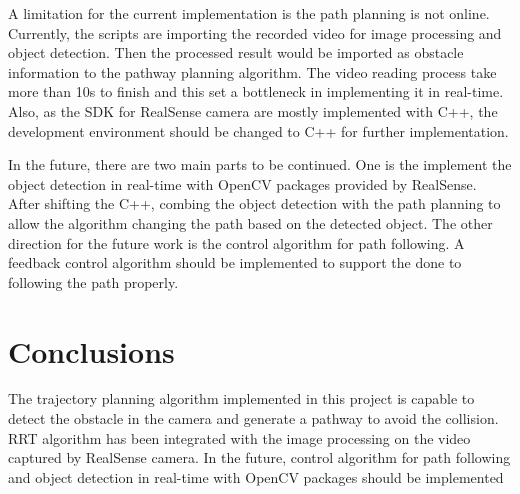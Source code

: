 \documentclass[
  oneside]{ubcthesis}
\begin{document}
A limitation for the current implementation is the path planning is not online. Currently, the scripts are importing the recorded video for image processing and object detection. Then the processed result would be imported as obstacle information to the pathway planning algorithm. The video reading process take more than 10s to finish and this set a bottleneck in implementing it in real-time. Also, as the SDK for RealSense camera are mostly implemented with C++, the development environment should be changed to C++ for further implementation.

In the future, there are two main parts to be continued. One is the implement the object detection in real-time with OpenCV packages provided by RealSense. After shifting the C++, combing the object detection with the path planning to allow the algorithm changing the path based on the detected object. The other direction for the future work is the control algorithm for path following. A feedback control algorithm should be implemented to support the done to following the path properly.

\hypertarget{conclusions}{%
\chapter{Conclusions}\label{conclusions}}

The trajectory planning algorithm implemented in this project is capable to detect the obstacle in the camera and generate a pathway to avoid the collision. RRT algorithm has been integrated with the image processing on the video captured by RealSense camera. In the future, control algorithm for path following and object detection in real-time with OpenCV packages should be implemented

  
\end{document}
